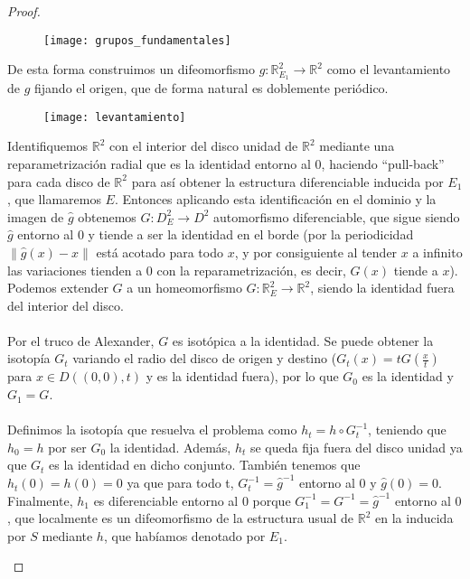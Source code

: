 \begin{proof}
\begin{enumerate}
			\begin{figure}[h]
  				\centering
  				\texttt{[image: grupos\_fundamentales]}
  				\label{fig:fundamental}
			\end{figure}
			 
			De esta forma construimos un difeomorfismo $\widehat{g}:\mathbb{R}^2_{E_1} \rightarrow \mathbb{R}^2$ como el levantamiento de $g$ fijando el origen, que de forma natural es doblemente periódico.\\
			
			\begin{figure}[h]
  				\centering
  				\texttt{[image: levantamiento]}
  				\label{fig:levantamiento}
			\end{figure}
			
			Identifiquemos $\mathbb{R}^2$ con el interior del disco unidad de $\mathbb{R}^2$ mediante una reparametrización radial que es la identidad entorno al $0$, haciendo ``pull-back'' para cada disco de $\mathbb{R}^2$ para así obtener la estructura diferenciable inducida por $E_1$, que llamaremos $E$. Entonces aplicando esta identificación en el dominio y la imagen de $\widehat{g}$ obtenemos $G:D^2_{E} \rightarrow D^2$ automorfismo diferenciable, que sigue siendo $\widehat{g}$ entorno al $0$ y tiende a ser la identidad en el borde (por la periodicidad $\|\widehat{g}(x) - x\|$ está acotado para todo $x$, y por consiguiente al tender $x$ a infinito las variaciones tienden a $0$ con la reparametrización, es decir, $G(x)$ tiende a $x$). Podemos extender $G$ a un homeomorfismo $G:\mathbb{R}^2_{E} \rightarrow \mathbb{R}^2$, siendo la identidad fuera del interior del disco.\\
			\\ Por el truco de Alexander, $G$ es isotópica a la identidad. Se puede obtener la isotopía $G_t$ variando el radio del disco de origen y destino ($G_t(x) = tG(\frac{x}{t})$ para $x \in D((0,0), t)$ y es la identidad fuera), por lo que $G_0$ es la identidad y $G_1=G$.\\
			\\ Definimos la isotopía que resuelva el problema como $h_t=h\circ G_t^{-1}$, teniendo que $h_0=h$ por ser $G_0$ la identidad. Además, $h_t$ se queda fija fuera del disco unidad ya que $G_t$ es la identidad en dicho conjunto. También tenemos que $h_t(0)=h(0)=0$ ya que para todo t, $G_t^{-1} = \widehat{g}^{-1}$ entorno al $0$ y $\widehat{g}(0)=0$. Finalmente, $h_1$ es diferenciable entorno al $0$ porque $G_1^{-1}=G^{-1} = \widehat{g}^{-1}$ entorno al $0$, que localmente es un difeomorfismo de la estructura usual de $\mathbb{R}^2$ en la inducida por $S$ mediante $h$, que habíamos denotado por $E_1$.

\end{enumerate}
\end{proof}
